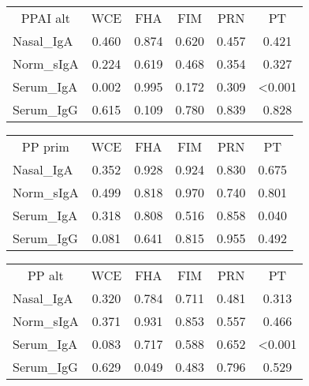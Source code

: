 \documentclass[
]{article}
\begin{document}
\begin{tabular}{>{}l|>{}c|>{}c|>{}c|>{}c|c}
\hline
\multicolumn{1}{c|}{PPAI alt} & \multicolumn{1}{c|}{WCE} & \multicolumn{1}{c|}{FHA} & \multicolumn{1}{c|}{FIM} & \multicolumn{1}{c|}{PRN} & \multicolumn{1}{c}{PT} \\
\cline{1-1} \cline{2-2} \cline{3-3} \cline{4-4} \cline{5-5} \cline{6-6}
Nasal\_IgA & 0.460 & 0.874 & 0.620 & 0.457 & 0.421\\
\hline
Norm\_sIgA & 0.224 & 0.619 & 0.468 & 0.354 & 0.327\\
\hline
Serum\_IgA & 0.002 & 0.995 & 0.172 & 0.309 & <0.001\\
\hline
Serum\_IgG & 0.615 & 0.109 & 0.780 & 0.839 & 0.828\\
\hline
\end{tabular}

\begin{tabular}{>{}l|>{}c|>{}c|>{}c|>{}c|c}
\hline
\multicolumn{1}{c|}{PP prim} & \multicolumn{1}{c|}{WCE} & \multicolumn{1}{c|}{FHA} & \multicolumn{1}{c|}{FIM} & \multicolumn{1}{c|}{PRN} & \multicolumn{1}{c}{PT} \\
\cline{1-1} \cline{2-2} \cline{3-3} \cline{4-4} \cline{5-5} \cline{6-6}
Nasal\_IgA & 0.352 & 0.928 & 0.924 & 0.830 & 0.675\\
\hline
Norm\_sIgA & 0.499 & 0.818 & 0.970 & 0.740 & 0.801\\
\hline
Serum\_IgA & 0.318 & 0.808 & 0.516 & 0.858 & 0.040\\
\hline
Serum\_IgG & 0.081 & 0.641 & 0.815 & 0.955 & 0.492\\
\hline
\end{tabular}

\begin{tabular}{>{}l|>{}c|>{}c|>{}c|>{}c|c}
\hline
\multicolumn{1}{c|}{PP alt} & \multicolumn{1}{c|}{WCE} & \multicolumn{1}{c|}{FHA} & \multicolumn{1}{c|}{FIM} & \multicolumn{1}{c|}{PRN} & \multicolumn{1}{c}{PT} \\
\cline{1-1} \cline{2-2} \cline{3-3} \cline{4-4} \cline{5-5} \cline{6-6}
Nasal\_IgA & 0.320 & 0.784 & 0.711 & 0.481 & 0.313\\
\hline
Norm\_sIgA & 0.371 & 0.931 & 0.853 & 0.557 & 0.466\\
\hline
Serum\_IgA & 0.083 & 0.717 & 0.588 & 0.652 & <0.001\\
\hline
Serum\_IgG & 0.629 & 0.049 & 0.483 & 0.796 & 0.529\\
\hline
\end{tabular}
\end{document}
